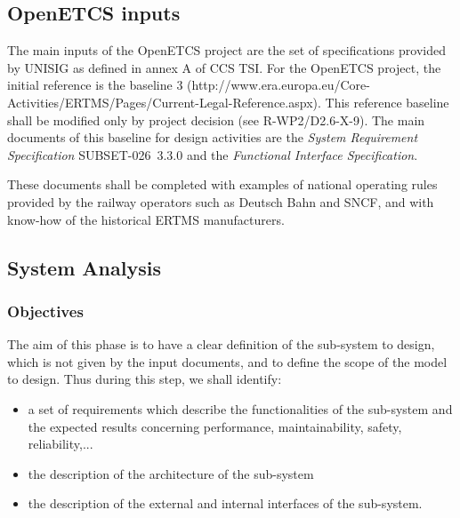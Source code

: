 
\subsection{OpenETCS inputs}
\label{sec:inputs}


The main inputs of the OpenETCS project are the set of specifications provided by UNISIG as defined in annex A of CCS TSI. For the OpenETCS project, the initial reference is the baseline 3 (http://www.era.europa.eu/Core-Activities/ERTMS/Pages/Current-Legal-Reference.aspx). This reference baseline shall be modified only by project decision (see R-WP2/D2.6-X-9).
The main documents of this baseline for design activities are the \emph{System Requirement Specification} SUBSET-026~3.3.0 and the \textit{Functional Interface Specification}.

These documents shall be completed with examples of national operating rules
provided by the railway operators such as Deutsch Bahn and SNCF, and with
know-how of the historical ERTMS manufacturers.




\subsection{System Analysis}
\label{sec:sys-analysis}


\subsubsection{Objectives}
\label{sec:sys-ana-objective}

The aim of this phase is to have a clear definition of the sub-system to design, which is not given by the input documents, and to define the scope of the model to design. Thus during this step, we shall identify:

\begin{itemize}
\item a set of requirements which describe the functionalities of the sub-system and the expected results concerning performance, maintainability, safety, reliability,...
\item the description of the architecture of the sub-system
\item the description of the external and internal interfaces of the sub-system.
\end{itemize}

